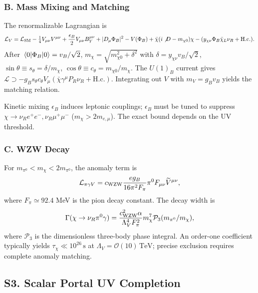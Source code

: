 \documentclass[aps,twocolumn,superscriptaddress,groupedaddress,nofootinbib,floatfix]{revtex4}
\newcommand{\TeV}{\,\mathrm{TeV}}
\newcommand{\s}{\,\mathrm{s}}
\begin{document}
\subsubsection*{B. Mass Mixing and Matching}
The renormalizable Lagrangian is
\begin{equation}
\mathcal{L}_V=\mathcal{L}_{\rm SM}-\tfrac14V_{\mu\nu}V^{\mu\nu}+\frac{\epsilon_B}{2}V_{\mu\nu}B_Y^{\mu\nu}+|D_\mu\Phi_B|^2-V(\Phi_B)+\bar{\chi}(i\not D-m_{\chi0})\chi-(y_{\chi\nu}\Phi_B\bar{\chi}_L\nu_R+\mathrm{H.c.}). 
\end{equation}
After $\vev{\Phi_B}=v_B/\sqrt2$, $m_\chi=\sqrt{m_{\chi0}^2+\delta^2}$ with $\delta=y_{\chi\nu}v_B/\sqrt2$, $\sin\theta\equiv s_\theta=\delta/m_\chi$, $\cos\theta\equiv c_\theta=m_{\chi0}/m_\chi$. The $U(1)_B$ current gives $\mathcal{L}\supset-g_Bs_\theta c_\theta V_\mu(\bar\chi\gamma^\mu P_R\nu_R+\mathrm{H.c.})$. Integrating out $V$ with $m_V=g_Bv_B$ yields the matching relation.

Kinetic mixing $\epsilon_B$ induces leptonic couplings; $\epsilon_B$ must be tuned to suppress $\chi\to\nu_R e^+e^-, \nu_R \mu^+\mu^-$ ($m_\chi>2m_{e,\mu}$). The exact bound depends on the UV threshold.

\subsubsection*{C. WZW Decay}
For $m_{\pi^0}<m_\chi<2m_{\pi^0}$, the anomaly term is
\begin{equation}
\mathcal{L}_{\pi\gamma V}=c_{\rm WZW}\frac{eg_B}{16\pi^2F_\pi}\pi^0F_{\mu\nu}\widetilde V^{\mu\nu}, 
\end{equation} 
where $F_{\pi}\simeq 92.4$ MeV is the pion decay constant. 
The decay width is
\begin{equation}
\Gamma(\chi\to\nu_R\pi^0\gamma)=\frac{c_{\rm WZW}^2\alpha}{\Lambda_V^4F_\pi^2}m_\chi^7\mathcal P_3(m_{\pi^0}/m_\chi),
\end{equation}
where $\mathcal P_3$ is the dimensionless three-body phase integral. An order-one coefficient typically yields $\tau_\chi\ll10^{26}\s$ at $\Lambda_V = \mathcal{O}(10)\TeV$; precise exclusion requires complete anomaly matching.

\subsection*{S3. Scalar Portal UV Completion}
\end{document}
